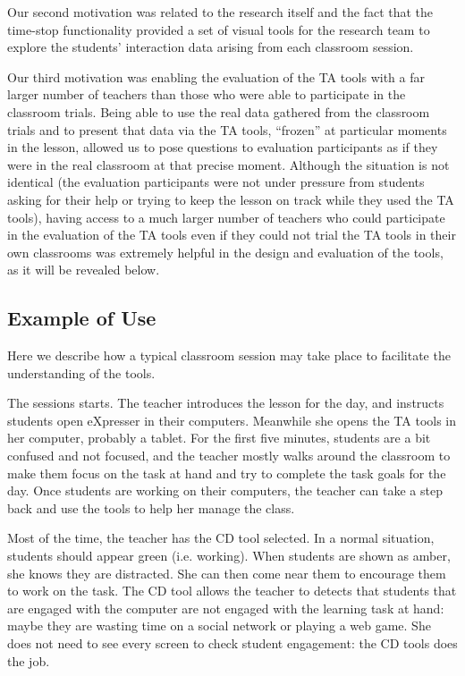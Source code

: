 Our second motivation was related to the research itself and the fact
that the time-stop functionality provided a set of visual tools for
the research team to explore the students’ interaction data arising
from each classroom session.

Our third motivation was enabling the evaluation of the TA tools with
a far larger number of teachers than those who were able to
participate in the classroom trials. Being able to use the real data
gathered from the classroom trials and to present that data via the TA
tools, “frozen” at particular moments in the lesson, allowed us to
pose questions to evaluation participants as if they were in the real
classroom at that precise moment. Although the situation is not
identical (the evaluation participants were not under pressure from
students asking for their help or trying to keep the lesson on track
while they used the TA tools), having access to a much larger number
of teachers who could participate in the evaluation of the TA tools
even if they could not trial the TA tools in their own classrooms was
extremely helpful in the design and evaluation of the tools, as it
will be revealed below.

\subsection{Example of Use}
\label{sec:example-use}

Here we describe how a typical classroom session may take place to
facilitate the understanding of the tools. 

The sessions starts. The teacher introduces the lesson for the day,
and instructs students open eXpresser in their computers. Meanwhile
she opens the TA tools in her computer, probably a tablet. For the
first five minutes, students are a bit confused and not focused, and
the teacher mostly walks around the classroom to make them focus on
the task at hand and try to complete the task goals for the day. Once
students are working on their computers, the teacher can take a step
back and use the tools to help her manage the class.

Most of the time, the teacher has the CD tool selected. In a normal
situation, students should appear green (i.e. working). When students
are shown as amber, she knows they are distracted. She can then come
near them to encourage them to work on the task. The CD tool allows
the teacher to detects that students that are engaged with the
computer are not engaged with the learning task at hand: maybe they
are wasting time on a social network or playing a web game. She does
not need to see every screen to check student engagement: the CD tools
does the job.

